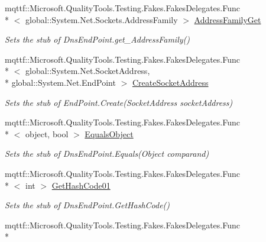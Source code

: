 \begin{DoxyCompactItemize}
\item 
mqttf\-::\-Microsoft.\-Quality\-Tools.\-Testing.\-Fakes.\-Fakes\-Delegates.\-Func\\*
$<$ global\-::\-System.\-Net.\-Sockets.\-Address\-Family $>$ \hyperlink{class_system_1_1_net_1_1_fakes_1_1_stub_dns_end_point_aef88bf8b1a4e422144dd3e6cd5b5196d}{Address\-Family\-Get}
\begin{DoxyCompactList}\small\item\em Sets the stub of Dns\-End\-Point.\-get\-\_\-\-Address\-Family()\end{DoxyCompactList}\item 
mqttf\-::\-Microsoft.\-Quality\-Tools.\-Testing.\-Fakes.\-Fakes\-Delegates.\-Func\\*
$<$ global\-::\-System.\-Net.\-Socket\-Address, \\*
global\-::\-System.\-Net.\-End\-Point $>$ \hyperlink{class_system_1_1_net_1_1_fakes_1_1_stub_dns_end_point_a100a8c8a7f1a4671f4d74d8ff59bd32d}{Create\-Socket\-Address}
\begin{DoxyCompactList}\small\item\em Sets the stub of End\-Point.\-Create(\-Socket\-Address socket\-Address)\end{DoxyCompactList}\item 
mqttf\-::\-Microsoft.\-Quality\-Tools.\-Testing.\-Fakes.\-Fakes\-Delegates.\-Func\\*
$<$ object, bool $>$ \hyperlink{class_system_1_1_net_1_1_fakes_1_1_stub_dns_end_point_a62f0da54998d4aacf0e66b926a9429af}{Equals\-Object}
\begin{DoxyCompactList}\small\item\em Sets the stub of Dns\-End\-Point.\-Equals(\-Object comparand)\end{DoxyCompactList}\item 
mqttf\-::\-Microsoft.\-Quality\-Tools.\-Testing.\-Fakes.\-Fakes\-Delegates.\-Func\\*
$<$ int $>$ \hyperlink{class_system_1_1_net_1_1_fakes_1_1_stub_dns_end_point_ad56c8873d2b4ebbe19ae059f1470e893}{Get\-Hash\-Code01}
\begin{DoxyCompactList}\small\item\em Sets the stub of Dns\-End\-Point.\-Get\-Hash\-Code()\end{DoxyCompactList}\item 
mqttf\-::\-Microsoft.\-Quality\-Tools.\-Testing.\-Fakes.\-Fakes\-Delegates.\-Func\\*

\end{DoxyCompactItemize}
